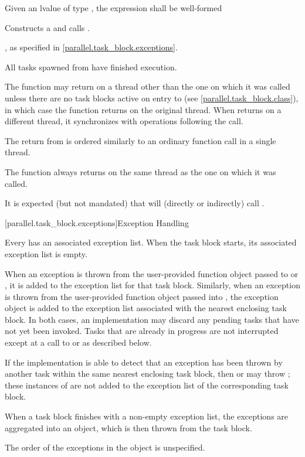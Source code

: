 \begin{itemdescr}
\pnum \requires Given an lvalue  of type , the expression  shall be well-formed

\pnum \effects Constructs a   and calls .

\pnum \throws {}, as specified in \ref{parallel.task_block.exceptions}.

\pnum \postconditions All tasks spawned from  have finished execution.

\pnum \remarks The  function may return on a thread
other than the one on which it was called unless there are no task blocks
active on entry to  (see
    \ref{parallel.task_block.class}), in which case the function returns on the
original thread. When  returns on a different thread, it
synchronizes with operations following the call. \begin{note}The return from
 is ordered similarly to an ordinary function
call in a single thread.\end{note} The 
function always returns on the same thread as the one on which it was called.

\pnum \realnotes It is expected (but not mandated) that  will (directly or indirectly) call .
\end{itemdescr}

[parallel.task_block.exceptions]{Exception Handling}

\pnum Every  has an associated exception list. When the task block starts, its associated exception list is empty.

\pnum When an exception is thrown from the user-provided function object passed
to  or , it is
added to the exception list for that task block. Similarly, when an exception
is thrown from the user-provided function object passed into
, the exception object is added to the exception list
associated with the nearest enclosing task block. In both cases, an
implementation may discard any pending tasks that have not yet been invoked.
Tasks that are already in progress are not interrupted except at a call to
 or  as described below.

\pnum If the implementation is able to detect that an exception has been thrown
by another task within the same nearest enclosing task block, then
 or  may throw
; these instances of
 are not added to the exception list of the
corresponding task block.

\pnum When a task block finishes with a non-empty exception list, the
exceptions are aggregated into an  object, which is then thrown
from the task block.

\pnum The order of the exceptions in the  object is unspecified.


